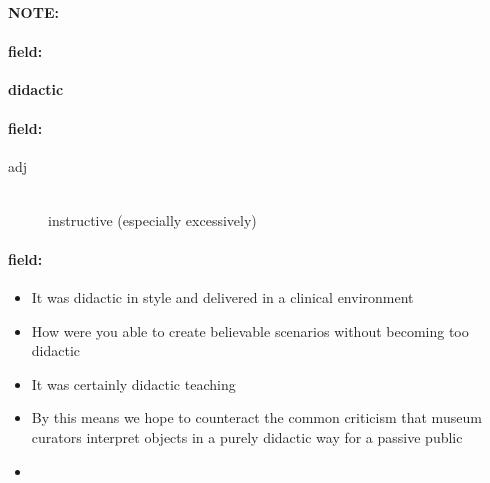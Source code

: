 \documentclass[12pt]{article}
\newenvironment{note}{\paragraph{NOTE:}}{}
\newenvironment{field}{\paragraph{field:}}{}
\begin{document}
\begin{note}
\begin{field}
\textbf{\large didactic}
\end{field}


\begin{field}
\begin{description}
\item[adj] \hfill \\ 
instructive (especially excessively)

\end{description}
\end{field}

\begin{field}
\begin{itemize}
\item It was didactic in style and delivered in a clinical environment
\item How were you able to create believable scenarios without becoming too didactic
\item It was certainly didactic teaching
\item By this means we hope to counteract the common criticism that museum curators interpret objects in a purely didactic way for a passive public
\item 
\end{itemize}
\end{field}
\end{note}
\end{document}
